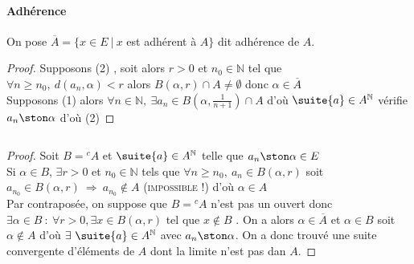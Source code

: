 		\paragraph{Adhérence} On pose $\overline{A} = \{ x\in E ~\vert ~x$ est adhérent à $A\}$ dit adhérence de $A$. \trait
		\vspace*{0.5cm} \\ 
		\begin{proof}
		\fbox{$\Leftarrow$} Supposons {\tiny (2)} , soit alors $r>0$ et $n_0\in\mathbb{N}$ tel que \\$\forall n\geq n_0 ,~d(a_n,\alpha ) <r$ 
		alors $B(\alpha , r) \cap A \neq \emptyset$ donc $\alpha \in \overline{A}$ \\ \fbox{$\Rightarrow$} Supposons {\tiny (1)} alors 
		$\forall n\in \mathbb{N} , ~\exists a_n \in B(\alpha, \frac{1}{n+1} ) \cap A$ d'où $\suite{a} \in A^{\mathbb{N}}$ 
		vérifie $a_n \ston \alpha$ d'où {\tiny (2)}		
		\end{proof}
		${}$ \\ 
		\begin{proof}
		\fbox{$\Rightarrow$} Soit $B={^cA}$ et $\suite{a} \in A^{\mathbb{N}}$ telle que $a_n \ston \alpha\in E$ \\
		Si $\alpha \in B$, $\exists r>0$ et $n_0\in\mathbb{N}$ tels que $\forall n\geq n_0 ,~a_n\in B(\alpha ,r)$ soit $a_{n_0} \in B(\alpha ,r)~
		\Rightarrow ~a_{n_0}\notin A$ (\textsc{impossible !}) d'où $\alpha\in A$\\
		\fbox{$\Leftarrow$} Par contraposée, on suppose que $B={^cA} $ n'est pas un ouvert donc $\exists \alpha \in B ~:~ 
		\forall r>0, 
		 \exists x\in B(\alpha,r)$ tel que $x\notin B$ . On a alors $\alpha\in\overline{A}$ et $\alpha\in B$ soit $\alpha \notin A$
		d'où $\exists~\suite{a} \in A^{\mathbb{N}}$ avec $a_n \ston \alpha$. On a donc trouvé une suite convergente d'éléments de $A$ 
		dont la limite n'est pas dan $A$.
		\end{proof}
		${}$ \\ 
